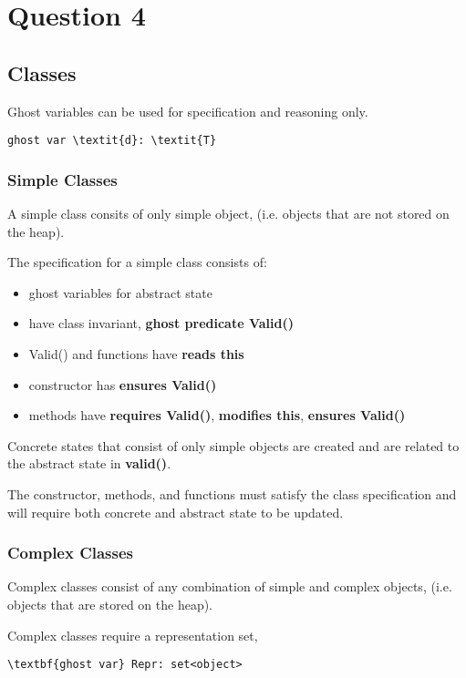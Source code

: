 \section{Question 4}
\subsection{Classes}
Ghost variables can be used for specification and reasoning only.
\begin{Verbatim}[commandchars=\\\{\}]
    ghost var \textit{d}: \textit{T}
\end{Verbatim}

\subsubsection{Simple Classes}
A simple class consits of only simple object, (i.e. objects that are not stored on the heap).

The specification for a simple class consists of:
\begin{itemize}
    \item ghost variables for abstract state
    \item have class invariant, \textbf{ghost predicate Valid()}
    \item Valid() and functions have \textbf{reads this}
    \item constructor has \textbf{ensures Valid()}
    \item methods have \textbf{requires Valid()}, \textbf{modifies this}, \textbf{ensures Valid()}
\end{itemize}

Concrete states that consist of only simple objects are created and are related to the abstract state in \textbf{valid()}.

The constructor, methods, and functions must satisfy the class specification and will require both concrete and abstract state to be updated.

\subsubsection{Complex Classes}
Complex classes consist of any combination of simple and complex objects, (i.e. objects that are stored on the heap).

Complex classes require a representation set,
\begin{Verbatim}[commandchars=\\\{\}]
    \textbf{ghost var} Repr: set<object>
\end{Verbatim}

